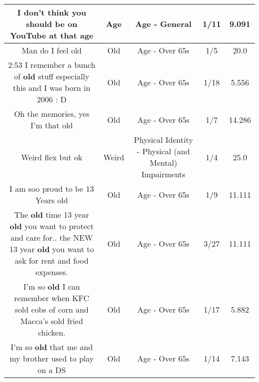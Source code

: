 \documentclass[11pt]{article}
\newlength\mylength
\begin{document}
\begin{center}
\begin{longtable}{|C{.65\mylength}|C{.30\mylength}|C{.12\mylength}|C{.12\mylength}|C{.12\mylength}|}
  \small I don't think you should be on YouTube at that age\normalsize   & Age & Age - General & 1/11 & 9.091 \\  \hline
  \small Man do I feel old\normalsize   & Old & Age - Over 65s & 1/5 & 20.0 \\  \hline
  \small 2:53 I remember a bunch of \textbf{old} stuff especially this and I was born in 2006 : D\normalsize   & Old & Age - Over 65s & 1/18 & 5.556 \\  \hline
  \small Oh the memories, yes I'm that old\normalsize   & Old & Age - Over 65s & 1/7 & 14.286 \\  \hline
  \small Weird flex but ok\normalsize   & Weird & Physical Identity - Physical (and Mental) Impairments & 1/4 & 25.0 \\  \hline
  \small I am soo proud to be 13 Years old\normalsize   & Old & Age - Over 65s & 1/9 & 11.111 \\  \hline
  \small The \textbf{old} time 13 year \textbf{old} you want to protect and care for.. the NEW 13 year \textbf{old} you want to ask for rent and  food  expenses.\normalsize   & Old & Age - Over 65s & 3/27 & 11.111 \\  \hline
  \small I'm so \textbf{old} I can remember when KFC sold cobs of corn and Macca's sold fried chicken.\normalsize   & Old & Age - Over 65s & 1/17 & 5.882 \\  \hline
  \small I'm so \textbf{old} that me and my brother used to play on a DS\normalsize   & Old & Age - Over 65s & 1/14 & 7.143 \\  \hline

\end{longtable}
\end{center}
\end{document}
